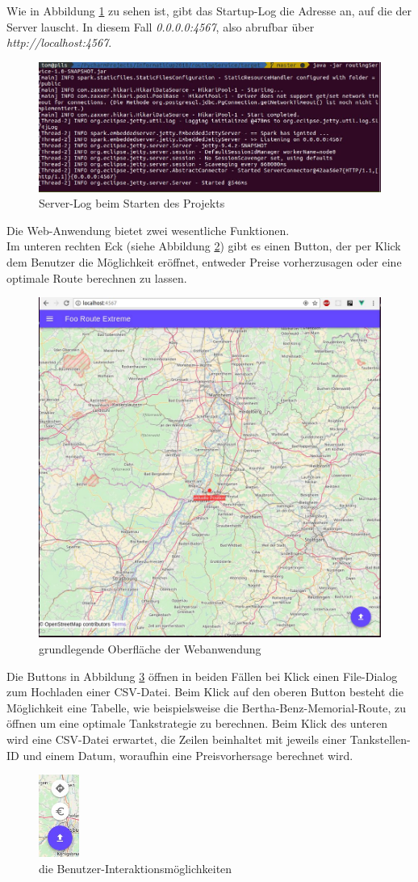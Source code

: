 \documentclass[
ngerman          %
,a4paper          %
,11pt
,pdftex
]{report}
\begin{document}
Wie in Abbildung \ref{fig:install1} zu sehen ist, gibt das Startup-Log die Adresse an, auf die der Server lauscht. In diesem Fall {\em 0.0.0.0:4567}, also abrufbar über {\em http://localhost:4567}.
\begin{figure}[H]
\centering
\includegraphics[width=1\linewidth]{install1.jpg}
\caption{Server-Log beim Starten des Projekts}
\label{fig:install1}
\end{figure}
Die Web-Anwendung bietet zwei wesentliche Funktionen.\\
Im unteren rechten Eck (siehe Abbildung \ref{fig:install2}) gibt es einen Button, der per Klick dem Benutzer die Möglichkeit eröffnet, entweder Preise vorherzusagen oder eine optimale Route berechnen zu lassen.
\begin{figure}[H]
\centering
\includegraphics[width=0.6\linewidth]{install2.jpg}
\caption{grundlegende Oberfläche der Webanwendung}
\label{fig:install2}
\end{figure}
\clearpage

Die Buttons in Abbildung \ref{fig:install3} öffnen in beiden Fällen bei Klick einen File-Dialog zum Hochladen einer CSV-Datei.
Beim Klick auf den oberen Button besteht die Möglichkeit eine Tabelle, wie beispielsweise die Bertha-Benz-Memorial-Route, zu öffnen um eine optimale Tankstrategie zu berechnen. Beim Klick des unteren wird eine CSV-Datei erwartet, die Zeilen beinhaltet mit jeweils einer Tankstellen-ID und einem Datum, woraufhin eine Preisvorhersage berechnet wird.
\begin{figure}[H]
\centering
\includegraphics[width=50px]{install3.jpg}
\caption{die Benutzer-Interaktionsmöglichkeiten}
\label{fig:install3}
\end{figure}
\end{document}

